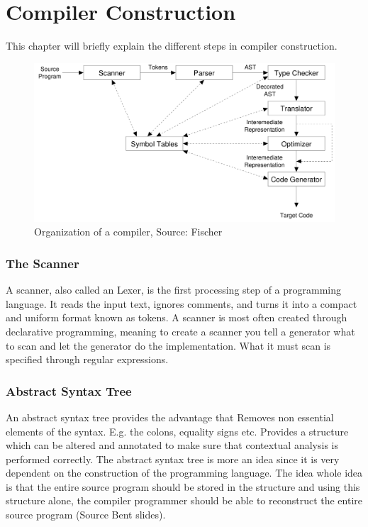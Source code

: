 \chapter{Compiler Construction}
This chapter will briefly explain the different steps in compiler construction. 
 \begin{figure}[H]
\centering
\includegraphics[width=\textwidth]{figures/compiler-process.png}
\caption{Organization of a compiler, Source: Fischer \cite{crafting-a-compiler} }
\label{syntax-overview}
\end{figure}

\subsection{The Scanner}
A scanner, also called an Lexer, is the first processing step of a programming language. It reads the input text, ignores comments, and turns it into a compact and uniform format known as tokens. 
A scanner is most often created through declarative programming, meaning to create a scanner you tell a generator what to scan and let the generator do the implementation. What it must scan is specified through regular expressions.



\subsection{Abstract Syntax Tree}
An abstract syntax tree provides the advantage that 
Removes non essential elements of the syntax. E.g. the colons, equality signs etc. 
Provides a structure which can be altered and annotated to make sure that contextual analysis is performed correctly.
The abstract syntax tree is more an idea since it is very dependent on the construction of the programming language. The idea whole idea is that the entire source program should be stored in the structure and using this structure alone, the compiler programmer should be able to reconstruct the entire source program (Source Bent slides).

